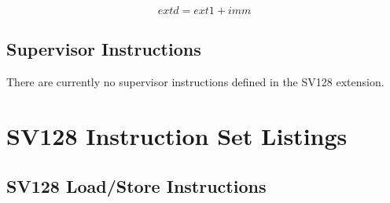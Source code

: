 \documentclass{article}
\begin{document}
\begin{equation}
extd = ext1 + imm
\end{equation}

\subsection{Supervisor Instructions}

There are currently no supervisor instructions defined in the SV128 extension.

\clearpage
\section{SV128 Instruction Set Listings}
\label{sec:SV128InstructionSetListings}

\subsection{SV128 Load/Store Instructions}
\end{document}
